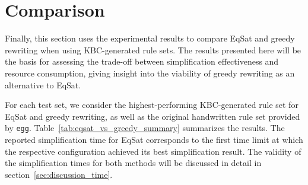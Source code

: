 \FloatBarrier
\section{Comparison}
\label{sec:result_comparison}
Finally, this section uses the experimental results to compare EqSat and greedy rewriting when using KBC-generated rule sets. The results presented here will be the basis for assessing the trade-off between simplification effectiveness and resource consumption, giving insight into the viability of greedy rewriting as an alternative to EqSat.

For each test set, we consider the highest-performing KBC-generated rule set for EqSat and greedy rewriting, as well as the original handwritten rule set provided by \texttt{egg}.
Table~\ref{tab:eqsat_vs_greedy_summary} summarizes the results.
The reported simplification time for EqSat corresponds to the first time limit at which the respective configuration achieved its best simplification result. The validity of the simplification times for both methods will be discussed in detail in section~\ref{sec:discussion_time}.

